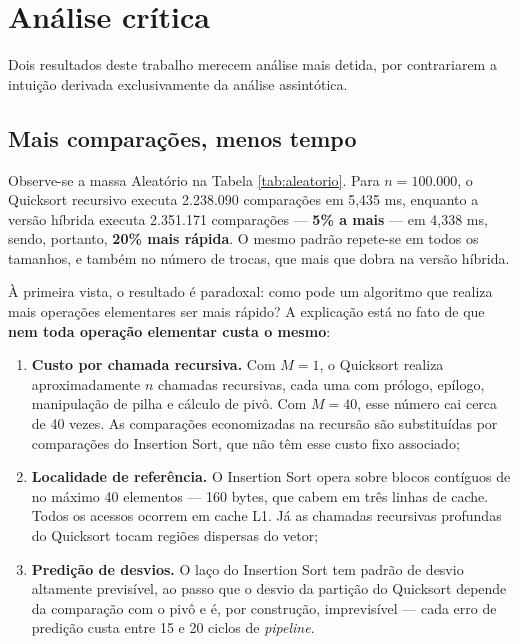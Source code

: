 \section{Análise crítica}
\label{sec:analise-critica}

Dois resultados deste trabalho merecem análise mais detida, por contrariarem a
intuição derivada exclusivamente da análise assintótica.

\subsection{Mais comparações, menos tempo}

Observe-se a massa Aleatório na Tabela \ref{tab:aleatorio}. Para $n = 100.000$, o
Quicksort recursivo executa 2.238.090 comparações em 5,435 ms, enquanto a versão
híbrida executa 2.351.171 comparações --- \textbf{5\% a mais} --- em 4,338 ms,
sendo, portanto, \textbf{20\% mais rápida}. O mesmo padrão repete-se em todos os
tamanhos, e também no número de trocas, que mais que dobra na versão híbrida.

À primeira vista, o resultado é paradoxal: como pode um algoritmo que realiza mais
operações elementares ser mais rápido? A explicação está no fato de que
\textbf{nem toda operação elementar custa o mesmo}:

\begin{enumerate}
  \item \textbf{Custo por chamada recursiva.} Com $M = 1$, o Quicksort realiza
        aproximadamente $n$ chamadas recursivas, cada uma com prólogo, epílogo,
        manipulação de pilha e cálculo de pivô. Com $M = 40$, esse número cai
        cerca de 40 vezes. As comparações economizadas na recursão são substituídas
        por comparações do Insertion Sort, que não têm esse custo fixo associado;

  \item \textbf{Localidade de referência.} O Insertion Sort opera sobre blocos
        contíguos de no máximo 40 elementos --- 160 bytes, que cabem em três linhas de
        cache. Todos os acessos ocorrem em cache L1. Já as chamadas recursivas
        profundas do Quicksort tocam regiões dispersas do vetor;

  \item \textbf{Predição de desvios.} O laço do Insertion Sort tem padrão de desvio
        altamente previsível, ao passo que o desvio da partição do Quicksort depende
        da comparação com o pivô e é, por construção, imprevisível --- cada erro de
        predição custa entre 15 e 20 ciclos de \textit{pipeline}.
\end{enumerate}

